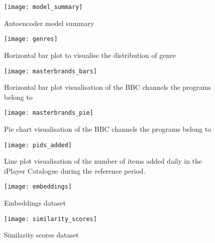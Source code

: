 
\begin{figure}[h]
  \centering
  \texttt{[image: model\_summary]}
  \caption{Autoencoder model summary}
  \label{fig:model_summary}
\end{figure}


\begin{figure}[h]
  \centering
  \texttt{[image: genres]}
  \caption{Horizontal bar plot to visualise the distribution of genre}
  \label{fig:genres}
\end{figure}

\begin{figure}[h]
  \centering
  \texttt{[image: masterbrands\_bars]}
  \caption{Horizontal bar plot visualisation of the BBC channels the programs belong to}
  \label{fig:masterbrands_bars}
\end{figure}

\begin{figure}[h]
  \centering
  \texttt{[image: masterbrands\_pie]}
  \caption{Pie chart visualisation of the BBC channels the programs belong to}
  \label{fig:masterbrands_pie}
\end{figure}

\begin{figure}[h]
  \centering
  \texttt{[image: pids\_added]}
  \caption{Line plot visualisation of the number of items added daily in the iPlayer Catalogue during the reference period.}
  \label{fig:pids_added}
\end{figure}

\begin{figure}[h]
  \centering
  \texttt{[image: embeddings]}
  \caption{Embeddings dataset}
  \label{fig:embeddings}
\end{figure}

\begin{figure}[h]
  \centering
  \texttt{[image: similarity\_scores]}
  \caption{Similarity scores dataset}
  \label{fig:similarity_scores}
\end{figure}

